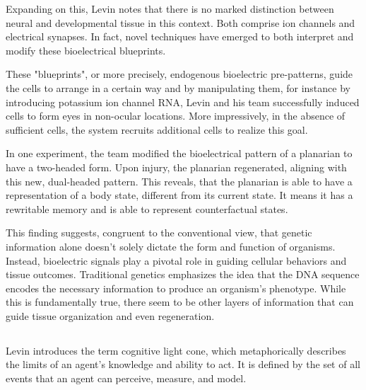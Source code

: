Expanding on this, Levin notes that there is no marked distinction between neural and developmental tissue in this context. Both comprise ion channels and electrical synapses. In fact, novel techniques have emerged to both interpret and modify these bioelectrical blueprints. 

These "blueprints", or more precisely, endogenous bioelectric pre-patterns, guide the cells to arrange in a certain way and by manipulating them, for instance by introducing potassium ion channel RNA, Levin and his team successfully induced cells to form eyes in non-ocular locations. More impressively, in the absence of sufficient cells, the system recruits additional cells to realize this goal.

In one experiment, the team modified the bioelectrical pattern of a planarian to have a two-headed form. Upon injury, the planarian regenerated, aligning with this new, dual-headed pattern. This reveals, that the planarian is able to have a representation of a body state, different from its current state. It means it has a rewritable memory and is able to represent \gls{counterfactual states}.

This finding suggests, congruent to the conventional view, that genetic information alone doesn't solely dictate the form and function of organisms. Instead, bioelectric signals play a pivotal role in guiding cellular behaviors and tissue outcomes. Traditional genetics emphasizes the idea that the DNA sequence encodes the necessary information to produce an organism's phenotype. While this is fundamentally true, there seem to be other layers of information that can guide tissue organization and even regeneration.




\subsection{}
Levin introduces the term \gls{cognitive light cone}, which metaphorically describes the limits of an agent's knowledge and ability to act. It is defined by the set of all events that an agent can perceive, measure, and model. 

